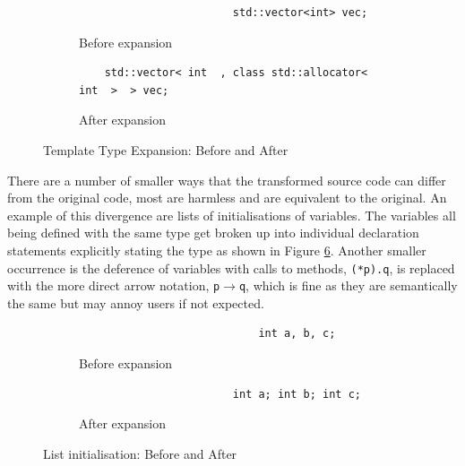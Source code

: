 \documentclass[bsc,frontabs,singlespacing,twoside,parskip,deptreport]{infthesis}
\begin{document}
\begin{figure}[H]
    \centering
    \begin{subfigure}[h]{\textwidth}
        \centering
        \begin{verbatim}
                        std::vector<int> vec;
        \end{verbatim}
        \caption{Before expansion}
        \label{fig:temp-expand-before}
        \vspace{0.40cm}
    \end{subfigure}
    \begin{subfigure}[h]{\textwidth}
        \centering
        \begin{verbatim}
    std::vector< int  , class std::allocator< int  >  > vec;
        \end{verbatim}
        \caption{After expansion}
        \label{fig:temp-expand-after}
    \end{subfigure}
    
    \caption{Template Type Expansion: Before and After}
    \label{fig:temp-expand}
\end{figure}

There are a number of smaller ways that the transformed source code can differ from the original code, most are harmless and are equivalent to the original. An example of this divergence are lists of initialisations of variables. The variables all being defined with the same type get broken up into individual declaration statements explicitly stating the type as shown in Figure \ref{fig:list-init}. Another smaller occurrence is the deference of variables with calls to methods, \texttt{(*p).q}, is replaced with the more direct arrow notation, \texttt{p$\rightarrow$q}, which is fine as they are semantically the same but may annoy users if not expected. 

\begin{figure}[!h]
    \centering
    \begin{subfigure}[h]{\textwidth}
        \centering
        \begin{verbatim}
                            int a, b, c;
        \end{verbatim}
        \caption{Before expansion}
        \label{fig:list-init-before}
        \vspace{0.40cm}
    \end{subfigure}
    \begin{subfigure}[h]{\textwidth}
        \centering
        \begin{verbatim}
                        int a; int b; int c;
        \end{verbatim}
        \caption{After expansion}
        \label{fig:list-init-after}
    \end{subfigure}
    \caption{List initialisation: Before and After}
    \label{fig:list-init}
\end{figure}
\end{document}
